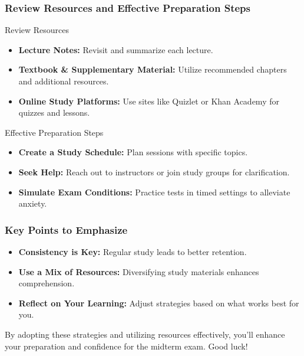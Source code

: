 \documentclass[aspectratio=169]{beamer}
\begin{document}
\begin{frame}[fragile]
    \frametitle{Review Resources and Effective Preparation Steps}
    
    \begin{block}{Review Resources}
        \begin{itemize}
            \item \textbf{Lecture Notes:} Revisit and summarize each lecture.
            \item \textbf{Textbook \& Supplementary Material:} Utilize recommended chapters and additional resources.
            \item \textbf{Online Study Platforms:} Use sites like Quizlet or Khan Academy for quizzes and lessons.
        \end{itemize}
    \end{block}
    
    \begin{block}{Effective Preparation Steps}
        \begin{itemize}
            \item \textbf{Create a Study Schedule:} Plan sessions with specific topics.
            \item \textbf{Seek Help:} Reach out to instructors or join study groups for clarification.
            \item \textbf{Simulate Exam Conditions:} Practice tests in timed settings to alleviate anxiety.
        \end{itemize}
    \end{block}
\end{frame}

\begin{frame}[fragile]
    \frametitle{Key Points to Emphasize}
    
    \begin{itemize}
        \item \textbf{Consistency is Key:} Regular study leads to better retention.
        \item \textbf{Use a Mix of Resources:} Diversifying study materials enhances comprehension.
        \item \textbf{Reflect on Your Learning:} Adjust strategies based on what works best for you.
    \end{itemize}
    
    By adopting these strategies and utilizing resources effectively, you'll enhance your preparation and confidence for the midterm exam. Good luck!
\end{frame}
\end{document}
